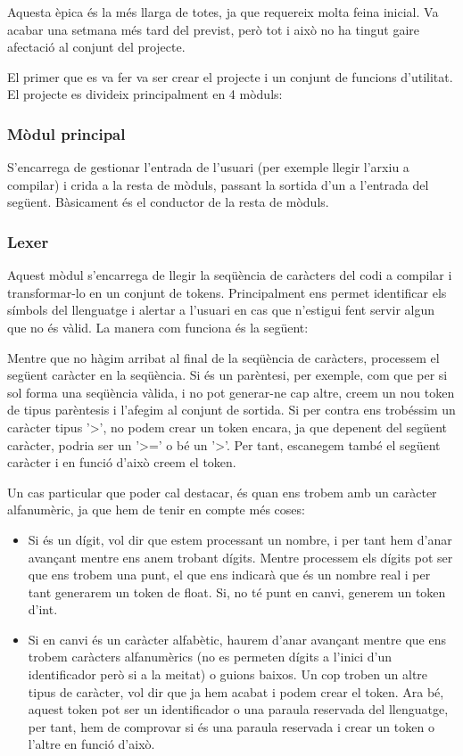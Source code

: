 ﻿\documentclass{article}
\begin{document}
Aquesta èpica és la més llarga de totes, ja que requereix molta feina inicial.
Va acabar una setmana més tard del previst, però tot i això no ha tingut gaire
afectació al conjunt del projecte.

El primer que es va fer va ser crear el projecte i un conjunt de funcions
d'utilitat. El projecte es divideix principalment en 4 mòduls:

\subsubsection{Mòdul principal}
S'encarrega de gestionar l'entrada de l'usuari (per exemple llegir l'arxiu a
compilar) i crida a la resta de mòduls, passant la  sortida d'un a l'entrada del
següent. Bàsicament és el conductor de la resta de mòduls.

\subsubsection{Lexer}
Aquest mòdul s'encarrega de llegir la seqüència de caràcters del codi a compilar
i transformar-lo en un conjunt de tokens. Principalment ens permet identificar
els símbols del llenguatge i alertar a l'usuari en cas que n'estigui fent servir
algun que no és vàlid. La manera com funciona és la següent:

Mentre que no hàgim arribat al final de la seqüència de caràcters, processem el
següent caràcter en la seqüència. 
Si és un parèntesi, per exemple, com que per si sol forma una seqüència vàlida,
i no pot generar-ne cap altre, creem un nou token de tipus parèntesis i l'afegim
al conjunt de sortida. Si per contra ens trobéssim un caràcter tipus '>', no
podem crear un token encara, ja que depenent del següent caràcter, podria ser un
'>=' o bé un '>'. Per tant, escanegem també el següent caràcter i en funció
d'això creem el token. 

Un cas particular que poder cal destacar, és quan ens trobem amb
un caràcter alfanumèric, ja que hem de tenir en compte més coses:

\begin{itemize}
\item
    Si és un dígit, vol dir que estem processant un nombre, i per tant hem
    d'anar avançant mentre ens anem trobant dígits. Mentre processem els dígits
    pot ser que ens trobem una punt, el que ens indicarà que és un nombre real i
    per tant generarem un token de float. Si, no té punt en canvi, generem un
    token d'int.
\item
    Si en canvi és un caràcter alfabètic, haurem d'anar avançant mentre que ens
    trobem caràcters alfanumèrics (no es permeten dígits a l'inici d'un
    identificador però si a la meitat) o guions baixos. Un cop troben un altre
    tipus de caràcter, vol dir que ja hem acabat i podem crear el token. Ara bé,
    aquest token pot ser un identificador o una paraula reservada del
    llenguatge, per tant, hem de comprovar si és una paraula reservada i crear
    un token o l'altre en funció d'això.
\end{itemize}
\end{document}
